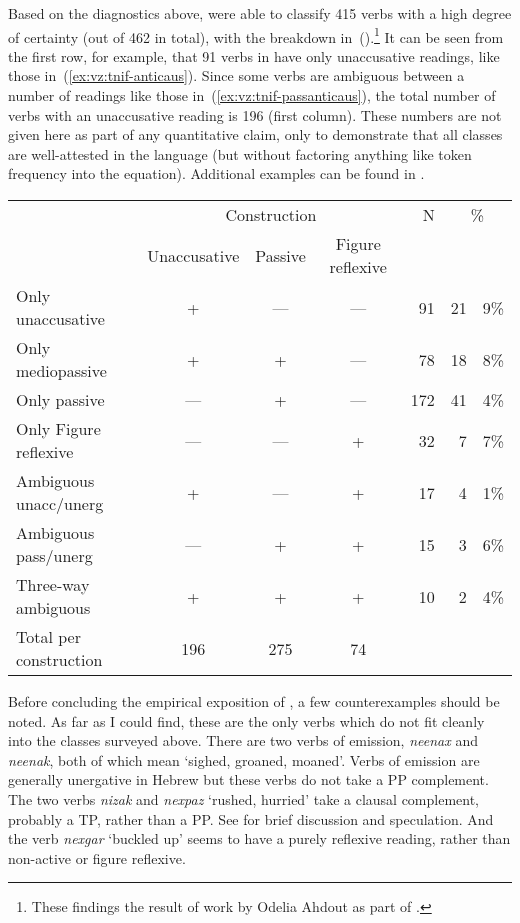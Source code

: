 Based on the diagnostics above, \cite{ahdoutkastner19nels} were able to classify 415 verbs with a high degree of certainty (out of 462 in total), with the breakdown in~(\nextx).\footnote{These findings the result of work by Odelia Ahdout as part of \citet{ahdout19phd}.} It can be seen from the first row, for example, that 91 verbs in {\tnif} have only unaccusative readings, like those in~(\ref{ex:vz:tnif-anticaus}). Since some verbs are ambiguous between a number of readings like those in~(\ref{ex:vz:tnif-passanticaus}), the total number of verbs with an unaccusative reading is 196 (first column). These numbers are not given here as part of any quantitative claim, only to demonstrate that all classes are well-attested in the language (but without factoring anything like token frequency into the equation). Additional examples can be found in \cite{ahdoutkastner19nels}.

\ex
\begin{tabular}{l|ccc|r|r@{.}l}
				& \multicolumn{3}{c|}{Construction}	& N	& \multicolumn{2}{c}{\%} \\
				 	& Unaccusative	& Passive & Figure reflexive & & \multicolumn{2}{c}{} \\\hline\hline
Only unaccusative			&	+			& ---			&	---		&	91	&	21&9\% \\
Only mediopassive			&	+			& +				& ---		&	78	&	18&8\% \\
Only passive					&	---			& +				&	---		&	172	& 41&4\% \\\hline
Only Figure reflexive		& ---			& ---			& +			& 32	& 7&7\% \\\hline
Ambiguous unacc/unerg	& +				& ---			& +			& 17	& 4&1\% \\
Ambiguous pass/unerg	& ---			& +				& +			& 15	& 3&6\% \\
Three-way ambiguous		& +				& +				& +			& 10	& 2&4\% \\\hline\hline
Total per construction		& 196		&	275				& 74 & \multicolumn{3}{l}{} \\

\end{tabular}
\xe

Before concluding the empirical exposition of {\tnif}, a few counterexamples should be noted. As far as I could find, these are the only verbs which do not fit cleanly into the classes surveyed above. There are two verbs of emission, \emph{neenax} and \emph{neenak}, both of which mean `sighed, groaned, moaned'. Verbs of emission are generally unergative in Hebrew \citep{siloni12,gafter14li} but these verbs do not take a PP complement. The two verbs \emph{nizak} and \emph{nexpaz} `rushed, hurried' take a clausal complement, probably a TP, rather than a PP. See \citet[126]{kastner16phd} for brief discussion and speculation. And the verb \emph{nexgar} `buckled up' seems to have a purely reflexive reading, rather than non-active or figure reflexive.

